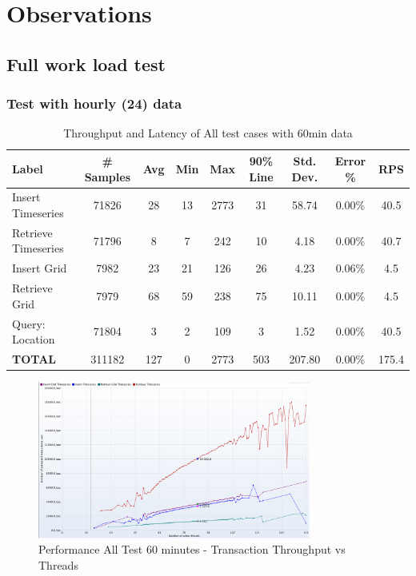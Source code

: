 \section{Observations}

\subsection{Full work load test}

\subsubsection{Test with hourly (24) data}
\begin{table}[]
\begin{tabulary}{\linewidth}{|L|C|C|C|C|C|C|C|C|}
\hline
Label & \# Samples & Avg & Min & Max & 90\% Line & Std. Dev. & Error \% & RPS \\ \hline
Insert Timeseries & 71826 & 28 & 13 & 2773 & 31 & 58.74 & 0.00\% & 40.5 \\ \hline
Retrieve Timeseries & 71796 & 8 & 7 & 242 & 10 & 4.18 & 0.00\% & 40.7 \\ \hline
Insert Grid & 7982 & 23 & 21 & 126 & 26 & 4.23 & 0.06\% & 4.5 \\ \hline
Retrieve Grid & 7979 & 68 & 59 & 238 & 75 & 10.11 & 0.00\% & 4.5 \\ \hline
Query: Location & 71804 & 3 & 2 & 109 & 3 & 1.52 & 0.00\% & 40.5 \\ \hline
\textbf{TOTAL} & 311182 & 127 & 0 & 2773 & 503 & 207.80 & 0.00\% & 175.4 \\ \hline
\end{tabulary}
\caption{Throughput and Latency of All test cases with 60min data}
\label{tab:obs_all_60_min_summary}
\end{table}

\begin{figure}[htp]
    \centering
    \includegraphics[width=0.8\textwidth]{results/obs/all/obs_all_60m_transaction_throughtput_vs_threads.png}
    \caption{Performance All Test 60 minutes - Transaction Throughput vs Threads}
    \label{fi:test_obs_all_60m_throughtput}
\end{figure}

